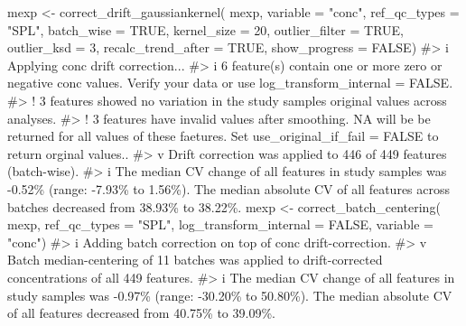 \documentclass[
  letterpaper,
  DIV=11,
  numbers=noendperiod]{scrartcl}
\newenvironment{Shaded}{\begin{snugshade}}{\end{snugshade}}
\newcommand{\AttributeTok}[1]{\textcolor[rgb]{0.40,0.45,0.13}{#1}}
\newcommand{\CommentTok}[1]{\textcolor[rgb]{0.37,0.37,0.37}{#1}}
\newcommand{\ConstantTok}[1]{\textcolor[rgb]{0.56,0.35,0.01}{#1}}
\newcommand{\DecValTok}[1]{\textcolor[rgb]{0.68,0.00,0.00}{#1}}
\newcommand{\FunctionTok}[1]{\textcolor[rgb]{0.28,0.35,0.67}{#1}}
\newcommand{\NormalTok}[1]{\textcolor[rgb]{0.00,0.23,0.31}{#1}}
\newcommand{\OtherTok}[1]{\textcolor[rgb]{0.00,0.23,0.31}{#1}}
\newcommand{\StringTok}[1]{\textcolor[rgb]{0.13,0.47,0.30}{#1}}
\begin{document}
\begin{Shaded}
\begin{Highlighting}[]
\NormalTok{mexp }\OtherTok{\textless{}{-}} \FunctionTok{correct\_drift\_gaussiankernel}\NormalTok{(}
\NormalTok{  mexp, }
  \AttributeTok{variable =} \StringTok{"conc"}\NormalTok{, }
  \AttributeTok{ref\_qc\_types =} \StringTok{"SPL"}\NormalTok{, }
  \AttributeTok{batch\_wise =} \ConstantTok{TRUE}\NormalTok{, }
  \AttributeTok{kernel\_size =} \DecValTok{20}\NormalTok{, }
  \AttributeTok{outlier\_filter =} \ConstantTok{TRUE}\NormalTok{, }
  \AttributeTok{outlier\_ksd =} \DecValTok{3}\NormalTok{, }
  \AttributeTok{recalc\_trend\_after =} \ConstantTok{TRUE}\NormalTok{, }
  \AttributeTok{show\_progress =} \ConstantTok{FALSE}\NormalTok{) }
\CommentTok{\#\textgreater{} i Applying \textasciigrave{}conc\textasciigrave{} drift correction...}
\CommentTok{\#\textgreater{} i 6 feature(s) contain one or more zero or negative \textasciigrave{}conc\textasciigrave{} values. Verify your data or use \textasciigrave{}log\_transform\_internal = FALSE\textasciigrave{}.}
\CommentTok{\#\textgreater{} ! 3 features showed no variation in the study sample\textquotesingle{}s original values across analyses.}
\CommentTok{\#\textgreater{} ! 3 features have invalid values after smoothing. NA will be be returned for all values of these faetures. Set \textasciigrave{}use\_original\_if\_fail = FALSE to return orginal values..}
\CommentTok{\#\textgreater{} v Drift correction was applied to 446 of 449 features (batch{-}wise).}
\CommentTok{\#\textgreater{} i The median CV change of all features in study samples was {-}0.52\% (range: {-}7.93\% to 1.56\%). The median absolute CV of all features across batches decreased from 38.93\% to 38.22\%.}
\NormalTok{mexp }\OtherTok{\textless{}{-}} \FunctionTok{correct\_batch\_centering}\NormalTok{(}
\NormalTok{  mexp, }
  \AttributeTok{ref\_qc\_types =} \StringTok{"SPL"}\NormalTok{, }
  \AttributeTok{log\_transform\_internal =} \ConstantTok{FALSE}\NormalTok{,}
  \AttributeTok{variable =} \StringTok{"conc"}\NormalTok{)}
\CommentTok{\#\textgreater{} i Adding batch correction on top of \textasciigrave{}conc\textasciigrave{} drift{-}correction.}
\CommentTok{\#\textgreater{} v Batch median{-}centering of 11 batches was applied to drift{-}corrected concentrations of all 449 features.}
\CommentTok{\#\textgreater{} i The median CV change of all features in study samples was {-}0.97\% (range: {-}30.20\% to 50.80\%).  The median absolute CV of all features decreased from 40.75\% to 39.09\%.}
\end{Highlighting}
\end{Shaded}
\end{document}
